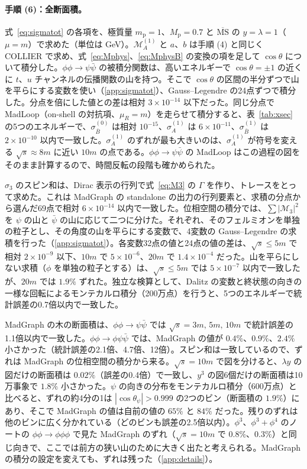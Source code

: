 \documentclass[a4paper,10pt]{ltjsarticle}
\newcommand{\MSbar}{\overline{\mathrm{MS}}}
\begin{document}
\paragraph{手順 (6)：全断面積。}式~\eqref{eq:sigmatot} の各項を、極質量 $m_{\mathrm p}=1$、$M_{\mathrm p}=0.7$ と $\MSbar$ の $y=\lambda=1$（$\mu=m$）で求めた（単位は GeV）。$\mathcal M_A^{(1)}$ と $a$、$b$ は手順 (4) と同じく COLLIER で求め、式~\eqref{eq:Mphys}、\eqref{eq:MphysB} の変換の項を足して $\cos\theta$ について積分した。$\phi\phi\to\psi\bar\psi$ の被積分関数は、高いエネルギーで $\cos\theta=\pm1$ の近くに $t$、$u$ チャンネルの伝播関数の山を持つ。そこで $\cos\theta$ の区間の半分ずつで山を平らにする変数を使い（\ref{app:sigmatot}）、Gauss--Legendre の24点ずつで積分した。分点を倍にした値との差は相対 $3\times10^{-14}$ 以下だった。同じ分点で MadLoop（on-shell の対抗項、$\mu_R=m$）を走らせて積分すると、表~\ref{tab:xsec} の5つのエネルギーで、$\sigma_{\bar B}^{(0)}$ は相対 $10^{-15}$、$\sigma_A^{(1)}$ は $6\times10^{-11}$、$\sigma_{\bar B}^{(1)}$ は $2\times10^{-10}$ 以内で一致した。$\sigma_A^{(1)}$ のずれが最も大きいのは、$\sigma_A^{(1)}$ が符号を変える $\sqrt s\approx8m$ に近い $10m$ の点である。$\phi\phi\to\psi\bar\psi$ の MadLoop はこの過程の図をそのまま計算するので、時間反転の段階も確かめられた。

$\sigma_3$ のスピン和は、Dirac 表示の行列で式~\eqref{eq:M3} の $\Gamma$ を作り、トレースをとって求めた。これは MadGraph の standalone の出力の行列要素と、求積の分点から選んだ69点で相対 $6\times10^{-14}$ 以内で一致した。位相空間の積分では、$\sum|\mathcal M_3|^2$ を $\psi$ の山と $\bar\psi$ の山に応じて二つに分けた。それぞれ、そのフェルミオンを単独の粒子とし、その角度の山を平らにする変数で、4変数の Gauss--Legendre の求積を行った（\ref{app:sigmatot}）。各変数32点の値と24点の値の差は、$\sqrt s\le5m$ で相対 $2\times10^{-9}$ 以下、$10m$ で $5\times10^{-6}$、$20m$ で $1.4\times10^{-4}$ だった。山を平らにしない求積（$\phi$ を単独の粒子とする）は、$\sqrt s\le5m$ では $5\times10^{-7}$ 以内で一致したが、$20m$ では $1.9\%$ ずれた。独立な検算として、Dalitz の変数と終状態の向きの一様な回転によるモンテカルロ積分（200万点）を行うと、5つのエネルギーで統計誤差の0.7倍以内で一致した。

MadGraph の木の断面積は、$\phi\phi\to\psi\bar\psi$ では $\sqrt s=3m,\,5m,\,10m$ で統計誤差の1.1倍以内で一致した。$\phi\phi\to\phi\psi\bar\psi$ では、MadGraph の値が $0.4\%$、$0.9\%$、$2.4\%$ 小さかった（統計誤差の2.1倍、4.7倍、12倍）。スピン和は一致しているので、ずれは MadGraph の位相空間の積分から来る。$\sqrt s=10m$ で図を分けると、$\lambda y$ の図だけの断面積は $0.02\%$（誤差の0.4倍）で一致し、$y^3$ の図6個だけの断面積は10万事象で $1.8\%$ 小さかった。$\psi$ の向きの分布をモンテカルロ積分（600万点）と比べると、ずれの約4分の1は $|\cos\theta_\psi|>0.999$ の2つのビン（断面積の $1.9\%$）にあり、そこで MadGraph の値は自前の値の $65\%$ と $84\%$ だった。残りのずれは他のビンに広く分かれている（どのビンも誤差の2.5倍以内）。$\phi^3$、$\phi^3+\phi^4$ のノートの $\phi\phi\to\phi\phi\phi$ で見た MadGraph のずれ（$\sqrt s=10m$ で $0.8\%$、$0.3\%$）と同じ向きで、ここでは前方の狭い山のために大きく出たと考えられる。MadGraph の積分の設定を変えても、ずれは残った（\ref{app:details}）。
\end{document}
